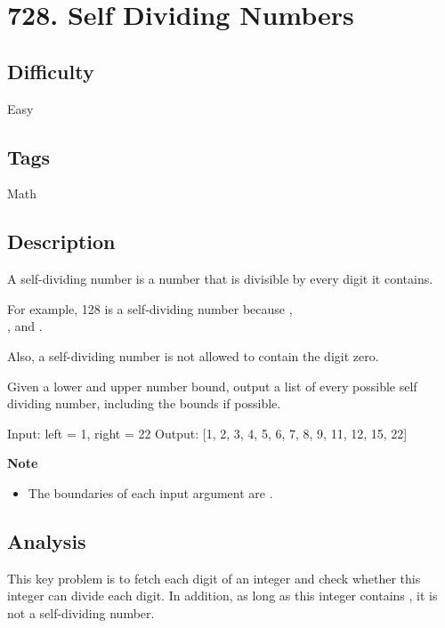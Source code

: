 \tocless\section{728. Self Dividing Numbers}
\label{algo:728}

\subsection*{Difficulty}
Easy

\subsection*{Tags}
Math

\subsection*{Description}
A self-dividing number is a number that is divisible by every digit it contains.

For example, 128 is a self-dividing number because , \\ , and .

Also, a self-dividing number is not allowed to contain the digit zero.

Given a lower and upper number bound, output a list of every possible self dividing number, including the bounds if possible.

\begin{example}
\begin{multilinecode}
Input: left = 1, right = 22
Output: [1, 2, 3, 4, 5, 6, 7, 8, 9, 11, 12, 15, 22]
\end{multilinecode}
\end{example}

\textbf{Note}
\begin{itemize}
    \item The boundaries of each input argument are .
\end{itemize}

\subsection*{Analysis}
This key problem is to fetch each digit of an integer and check whether this integer can divide each digit. In addition, as long as this integer contains , it is not a self-dividing number.

